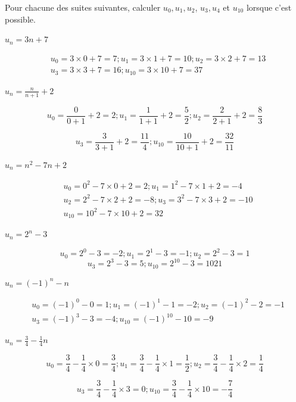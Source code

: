 \documentclass[11pt,a4paper]{article}  %
\begin{document}
Pour chacune des suites suivantes, calculer $u_0, u_1, u_2$, $u_3, u_4$ et $u_{10}$ lorsque c'est possible.
	\begin{enumMet}
		\item $u_n=3 n+7$
		\begin{corrBox}
			$$
			\begin{aligned}
				& u_0=3 \times 0+7=7 ; u_1=3 \times 1+7=10 ; u_2=3 \times 2+7=13 \\
				& u_3=3 \times 3+7=16 ; u_{10}=3 \times 10+7=37
			\end{aligned}
			$$
		\end{corrBox}
		\item $u_n=\frac{n}{n+1}+2$
		\begin{corrBox}
			$$
			u_0=\frac{0}{0+1}+2=2 ; u_1=\frac{1}{1+1}+2=\frac{5}{2} ; u_2=\frac{2}{2+1}+2=\frac{8}{3}
			$$
			
			
			$$
			u_3=\frac{3}{3+1}+2=\frac{11}{4} ; u_{10}=\frac{10}{10+1}+2=\frac{32}{11}
			$$
			
		\end{corrBox}
		\item $u_n=n^2-7 n+2$
		\begin{corrBox}
			$$
			\begin{aligned}
				& u_0=0^2-7 \times 0+2=2 ; u_1=1^2-7 \times 1+2=-4 \\
				& u_2=2^2-7 \times 2+2=-8 ; u_3=3^2-7 \times 3+2=-10 \\
				& u_{10}=10^2-7 \times 10+2=32
			\end{aligned}
			$$
		\end{corrBox}
		\item $u_n=2^n-3$
		\begin{corrBox}
			$$u_0=2^0-3=-2 ; u_1=2^1-3=-1 ; u_2=2^2-3=1$$
			$$
			u_3=2^3-3=5 ; u_{10}=2^{10}-3=1021
			$$
		\end{corrBox}	
		\item $u_n=(-1)^n-n$
		\begin{corrBox}
			$$
			\begin{aligned}
				& u_0=(-1)^0-0=1 ; u_1=(-1)^1-1=-2 ; u_2=(-1)^2-2=-1 \\
				& u_3=(-1)^3-3=-4 ; u_{10}=(-1)^{10}-10=-9
			\end{aligned}
			$$		
		\end{corrBox}
		\item $u_n=\frac{3}{4}-\frac{1}{4} n$
		\begin{corrBox}
			$$u_0=\frac{3}{4}-\frac{1}{4} \times 0=\frac{3}{4} ; u_1=\frac{3}{4}-\frac{1}{4} \times 1=\frac{1}{2} ; u_2=\frac{3}{4}-\frac{1}{4} \times 2=\frac{1}{4}$$
			
			$$
			u_3=\frac{3}{4}-\frac{1}{4} \times 3=0 ; u_{10}=\frac{3}{4}-\frac{1}{4} \times 10=-\frac{7}{4}
			$$		
		\end{corrBox}
	\end{enumMet}
\end{document}
